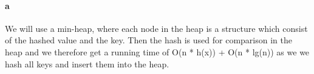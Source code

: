 \paragraph{a}
We will use a min-heap, where each node in the heap is a structure which consist
of the hashed value and the key. Then the hash is used for comparison in the
heap and we therefore get a running time of O(n * h(x)) + O(n * lg(n)) as we
we hash all keys and insert them into the heap.

